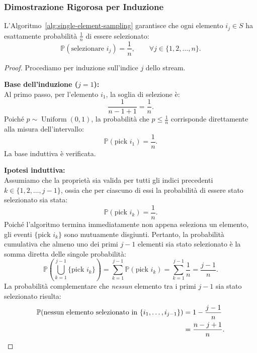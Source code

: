 \subsubsection{Dimostrazione Rigorosa per Induzione}
\begin{theorem}
L'Algoritmo~\ref{alg:single-element-sampling} garantisce che ogni elemento $i_j \in S$ ha esattamente probabilità $\frac{1}{n}$ di essere selezionato:
\begin{equation}
  \mathbb{P}(\text{selezionare } i_j) = \frac{1}{n}, \qquad \forall j \in \{1, 2, \dots, n\}.
\end{equation}
\end{theorem}

\begin{proof}
Procediamo per induzione sull'indice $j$ dello stream.

\textbf{Base dell'induzione ($j = 1$):}\\
Al primo passo, per l'elemento $i_1$, la soglia di selezione è:
\begin{equation}
  \frac{1}{n - 1 + 1} = \frac{1}{n}.
\end{equation}
Poiché $p \sim \operatorname{Uniform}(0, 1)$, la probabilità che $p \le \frac{1}{n}$ corrisponde direttamente alla misura dell'intervallo:
\begin{equation}
  \mathbb{P}(\text{pick } i_1) = \frac{1}{n}.
\end{equation}
La base induttiva è verificata.

\textbf{Ipotesi induttiva:}\\
Assumiamo che la proprietà sia valida per tutti gli indici precedenti $k \in \{1, 2, \dots, j - 1\}$, ossia che per ciascuno di essi la probabilità di essere stato selezionato sia stata:
\begin{equation}
  \mathbb{P}(\text{pick } i_k) = \frac{1}{n}.
\end{equation}
Poiché l'algoritmo termina immediatamente non appena seleziona un elemento, gli eventi $\{\text{pick } i_k\}$ sono mutuamente disgiunti. Pertanto, la probabilità cumulativa che almeno uno dei primi $j - 1$ elementi sia stato selezionato è la somma diretta delle singole probabilità:
\begin{equation}
  \mathbb{P}\left(\bigcup_{k=1}^{j-1} \{\text{pick } i_k\}\right) = \sum_{k=1}^{j-1} \mathbb{P}(\text{pick } i_k) = \sum_{k=1}^{j-1} \frac{1}{n} = \frac{j - 1}{n}.
\end{equation}
La probabilità complementare che \emph{nessun} elemento tra i primi $j - 1$ sia stato selezionato risulta:
\begin{align}
  \mathbb{P}(\text{nessun elemento selezionato in } \{i_1, \dots, i_{j-1}\}) &= 1 - \frac{j - 1}{n} \notag\\
  &= \frac{n - j + 1}{n}.
  \label{eq:prob-none-selected-before}
\end{align}


\end{proof}
